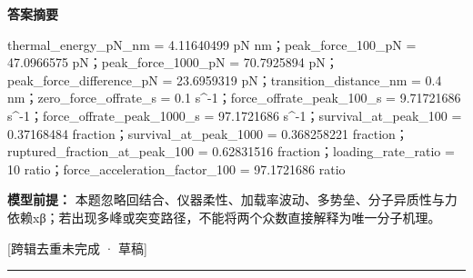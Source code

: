 \documentclass[UTF8,11pt,a4paper]{ctexart}
\begin{document}
\noindent\textbf{答案摘要}\par
thermal\_energy\_pN\_nm = 4.11640499 pN nm；peak\_force\_100\_pN = 47.0966575 pN；peak\_force\_1000\_pN = 70.7925894 pN；peak\_force\_difference\_pN = 23.6959319 pN；transition\_distance\_nm = 0.4 nm；zero\_force\_offrate\_s = 0.1 s\textasciicircum{}-1；force\_offrate\_peak\_100\_s = 9.71721686 s\textasciicircum{}-1；force\_offrate\_peak\_1000\_s = 97.1721686 s\textasciicircum{}-1；survival\_at\_peak\_100 = 0.37168484 fraction；survival\_at\_peak\_1000 = 0.368258221 fraction；ruptured\_fraction\_at\_peak\_100 = 0.62831516 fraction；loading\_rate\_ratio = 10 ratio；force\_acceleration\_factor\_100 = 97.1721686 ratio\par
\noindent\textbf{模型前提：}
本题忽略回结合、仪器柔性、加载率波动、多势垒、分子异质性与力依赖xβ；若出现多峰或突变路径，不能将两个众数直接解释为唯一分子机理。\par
\noindent\textcolor{red!65!black}{[跨辑去重未完成 · 草稿]} \par
\medskip\hrule\medskip
{}
\end{document}
